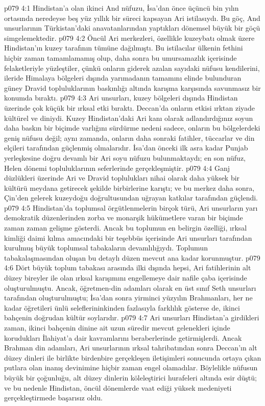 \vs p079 4:1 Hindistan’a olan ikinci And nüfuzu, İsa’dan önce üçüncü bin yılın ortasında neredeyse beş yüz yıllık bir süreci kapsayan Ari istilasıydı. Bu göç, And unsurlarının Türkistan’daki anavatanlarından yaptıkları dönemsel büyük bir göçü simgelemektedir.
\vs p079 4:2 Öncül Ari merkezleri, özellikle kuzeybatı olmak üzere Hindistan’ın kuzey tarafının tümüne dağılmıştı. Bu istilacılar ülkenin fethini hiçbir zaman tamamlamamış olup, daha sonra bu umursamazlık içerisinde felaketleriyle yüzleştiler, çünkü onların giderek azalan sayıdaki nüfusu kendilerini, ileride Himalaya bölgeleri dışında yarımadanın tamamını elinde bulunduran güney Dravid topluluklarının baskınlığı altında karışma karşısında savunmasız bir konumda bıraktı.
\vs p079 4:3 Ari unsurları, kuzey bölgeleri dışında Hindistan üzerinde çok küçük bir ırksal etki bıraktı. Deccan’da onların etkisi ırktan ziyade kültürel ve diniydi. Kuzey Hindistan’daki Ari kanı olarak adlandırdığınız soyun daha baskın bir biçimde varlığını sürdürme nedeni sadece, onların bu bölgelerdeki geniş nüfusu değil; aynı zamanda, onların daha sonraki fatihler, tüccarlar ve din elçileri tarafından güçlenmiş olmalarıdır. İsa’dan önceki ilk asra kadar Punjab yerleşkesine doğru devamlı bir Ari soyu nüfuzu bulunmaktaydı; en son nüfuz, Helen dönemi topluluklarının seferlerinde gerçekleşmiştir.
\vs p079 4:4 Ganj düzlükleri üzerinde Ari ve Dravid toplulukları nihai olarak daha yüksek bir kültürü meydana getirecek şekilde birbirlerine karıştı; ve bu merkez daha sonra, Çin’den gelerek kuzeydoğu doğrultusundan uğrayan katkılar tarafından güçlendi.
\vs p079 4:5 Hindistan’da toplumsal örgütlenmelerin birçok türü, Ari unsurların yarı demokratik düzenlerinden zorba ve monarşik hükümetlere varan bir biçimde zaman zaman gelişme gösterdi. Ancak bu toplumun en belirgin özelliği, ırksal kimliği daimi kılma amacındaki bir teşebbüs içerisinde Ari unsurları tarafından kurulmuş büyük toplumsal tabakaların devamlılığıydı. Toplumun tabakalaşmasından oluşan bu detaylı düzen mevcut ana kadar korunmuştur.
\vs p079 4:6 Dört büyük toplum tabakası arasında ilki dışında hepsi, Ari fatihlerinin alt düzey bireyler ile olan ırksal karışımını engellemeye dair nafile çaba içerisinde oluşturulmuştu. Ancak, öğretmen\hyp{}din adamları olarak en üst sınıf Seth unsurları tarafından oluşturulmuştu; İsa’dan sonra yirminci yüzyılın Brahmanları, her ne kadar öğretileri ünlü seleflerininkinden fazlasıyla farklılık gösterse de, ikinci bahçenin doğrudan kültür soylarıdır.
\vs p079 4:7 Ari unsurları Hindistan’a girdikleri zaman, ikinci bahçenin dinine ait uzun süredir mevcut gelenekleri içinde korudukları İlahiyat’a dair kavramlarını beraberlerinde getirmişlerdi. Ancak Brahman din adamları, Ari unsurlarının ırksal tahribatından sonra Deccan’ın alt düzey dinleri ile birlikte birdenbire gerçekleşen iletişimleri sonucunda ortaya çıkan putlara olan inanış devinimine hiçbir zaman engel olamadılar. Böylelikle nüfusun büyük bir çoğunluğu, alt düzey dinlerin köleleştirici hurafeleri altında esir düştü; ve bu nedenle Hindistan, öncül dönemlerde vaat ediği yüksek medeniyeti gerçekleştirmede başarısız oldu.
